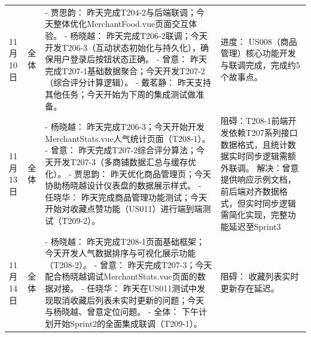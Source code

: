 \begin{levellist}
\begin{longtable}{>{\centering\arraybackslash}m{1cm} >{\centering\arraybackslash}m{1cm} >{\centering\arraybackslash}m{9cm} >{\centering\arraybackslash}m{2.5cm}}
        11月10日                                                  & 全体                                                     & - 贾思韵： 昨天完成T204-2与后端联调；今天整体优化MerchantFood.vue页面交互体验。 \newline
        - 杨晓越： 昨天完成T206-2联调；今天开发T206-3（互动状态初始化与持久化），确保用户登录后按钮状态正确。 \newline
        - 曾意： 昨天完成T207-1基础数据聚合；今天开发T207-2（综合评分计算逻辑）。 \newline
        - 戴茗静： 昨天支持其他任务；今天开始为下周的集成测试做准备。                        & 进度： US008（商品管理）核心功能开发与联调完成，完成约5个故事点。                                                                                                                \\
        11月13日                                                  & 全体                                                     & - 杨晓越： 昨天完成T206-3；今天开始开发MerchantStats.vue人气统计页面（T208-1）。 \newline
        - 曾意： 昨天完成T207-2综合评分算法；今天开发T207-3（多商铺数据汇总与缓存优化）。 \newline
        - 贾思韵： 昨天优化商品管理页；今天协助杨晓越设计仪表盘的数据展示样式。 \newline
        - 任晓华： 昨天完成商品管理功能测试；今天开始对收藏点赞功能（US011）进行端到端测试（T209-2）。  & 阻碍：T208-1前端开发依赖T207系列接口数据格式，且统计数据实时同步逻辑需额外联调。 \newline
        解决：曾意提供响应示例文档，前后端对齐数据格式，但实时同步逻辑需简化实现，完整功能延迟至Sprint3                                                                                                                                                           \\
        11月14日                                                  & 全体                                                     & - 杨晓越： 昨天完成T208-1页面基础框架；今天开发人气数据排序与可视化展示功能（T208-2）。 \newline
        - 曾意： 昨天完成T207-3；今天配合杨晓越调试MerchantStats.vue页面的数据对接。 \newline
        - 任晓华： 昨天在US011测试中发现取消收藏后列表未实时更新的问题；今天与杨晓越、曾意定位问题。 \newline
        - 全体： 下午计划开始Sprint2的全面集成联调（T209-1）。                     & 阻碍： 收藏列表实时更新存在延迟。 \newline

\end{longtable}
\end{levellist}
